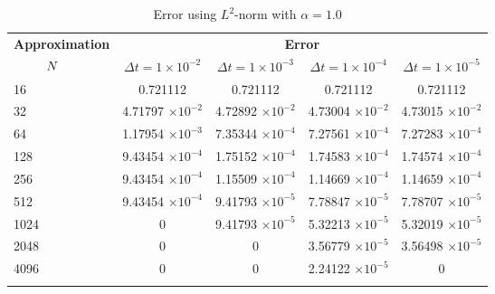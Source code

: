 	\begin{table}[H]
		\begin{tabular}{lcccc}
			\toprule
			\multicolumn{1}{c}{\textbf{Approximation}} & \multicolumn{4}{c}{\textbf{Error}} \\
			$\hspace{9mm}N$ & $\Delta t=1\times 10^{-2}$ & $\Delta t=1\times 10^{-3}$ & $\Delta t=1\times 10^{-4}$ & $\Delta t=1\times 10^{-5}$ \\
			\midrule
			\hspace{7mm} 16 & 0.721112    & 0.721112    & 0.721112    & 0.721112    \\
			\midrule
			\hspace{7mm} 32 & 4.71797 $\times 10^{-2}$   & 4.72892 $\times 10^{-2}$   & 4.73004 $\times 10^{-2}$   & 4.73015 $\times 10^{-2}$   \\
			\midrule
			\hspace{7mm} 64 & 1.17954 $\times 10^{-3}$  & 7.35344 $\times 10^{-4}$ & 7.27561 $\times 10^{-4}$ & 7.27283 $\times 10^{-4}$  \\
			\midrule
			\hspace{7mm} 128 & 9.43454 $\times 10^{-4}$ & 1.75152 $\times 10^{-4}$ & 1.74583 $\times 10^{-4}$ & 1.74574 $\times 10^{-4}$ \\
			\midrule
			\hspace{7mm} 256 & 9.43454 $\times 10^{-4}$ & 1.15509 $\times 10^{-4}$ & 1.14669 $\times 10^{-4}$ & 1.14659 $\times 10^{-4}$ \\
			\midrule
			\hspace{7mm} 512 & 9.43454 $\times 10^{-4}$ & 9.41793 $\times 10^{-5}$ & 7.78847 $\times 10^{-5}$ & 7.78707 $\times 10^{-5}$ \\
			\midrule
			\hspace{7mm} 1024 & 0           & 9.41793 $\times 10^{-5}$ & 5.32213 $\times 10^{-5}$ & 5.32019 $\times 10^{-5}$ \\
			\midrule
			\hspace{7mm} 2048 & 0           & 0           & 3.56779 $\times 10^{-5}$ & 3.56498 $\times 10^{-5}$ \\
			\midrule
			\hspace{7mm} 4096 & 0           & 0           & 2.24122 $\times 10^{-5}$ & 0           \\
			\\
			\bottomrule
		\end{tabular}
		\caption{Error using $L^2$-norm with $\alpha=1.0$}
		\label{Collocation_tabla_L2_alpha=1}
		\vspace{1cm}

\end{table}
